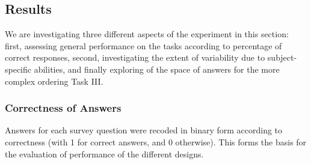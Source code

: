 \documentclass[journal]{vgtc}\usepackage{graphicx, color}
\begin{document}
\subsection{Results}\label{results}
We are investigating three different aspects  of the experiment in this section: first,  assessing general performance on the tasks according to percentage of correct responses, second, investigating the extent of variability due to subject-specific abilities, and finally exploring of the space of answers for the more complex ordering Task III.
\subsubsection*{Correctness of Answers}
Answers for each survey question  were recoded in binary form according to correctness (with 1 for correct answers, and 0 otherwise). This forms the basis for the evaluation of performance of the different designs.




\end{document}
